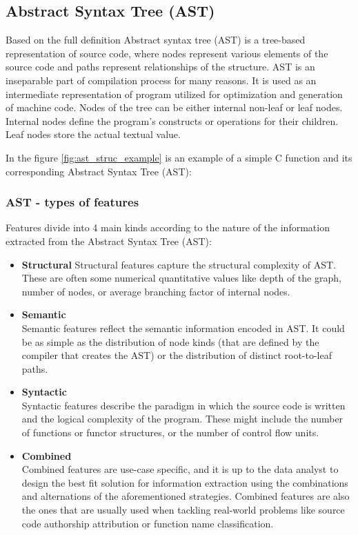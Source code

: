 \documentclass[conference]{IEEEtran}
\begin{document}
\subsection{Abstract Syntax Tree (AST)}

\quad Based on the full definition \citet{sun_ast} Abstract syntax tree (AST) is a tree-based representation of source code, where nodes represent various elements of the source code 
and paths represent relationships of the structure. AST is an inseparable part of compilation process for many reasons. It is used as an 
intermediate representation of program utilized for optimization and generation of machine code. Nodes of the tree can be either internal 
non-leaf or leaf nodes. Internal nodes define the program's constructs or operations for their children. Leaf nodes store the actual textual value. 

In the figure \ref{fig:ast_struc_example} is an example of a simple C function and its corresponding Abstract Syntax Tree (AST):

\subsubsection{AST - types of features}

Features divide into 4 main kinds according to the nature of the information extracted from the Abstract Syntax Tree (AST):
\begin{itemize}
    \item \textbf{Structural} \label{item:structural}
    Structural features capture the structural complexity of AST. These are often some numerical quantitative values like depth of the graph, number of nodes, or average branching factor of internal nodes.
    \item \textbf{Semantic} \\
    Semantic features reflect the semantic information encoded in AST. It could be as simple as the distribution of node kinds (that are defined by the compiler that creates the AST) or the distribution of distinct root-to-leaf paths.
    \item \textbf{Syntactic} \\
    Syntactic features describe the paradigm in which the source code is written and the logical complexity of the program. These might include the number of functions or functor structures, or the number of control flow units.
    \item \textbf{Combined} \\
    Combined features are use-case specific, and it is up to the data analyst to design the best fit solution for information extraction using the combinations and alternations of the aforementioned strategies. Combined features are also the ones that are usually used when tackling real-world problems like source code authorship attribution or function name classification.  
\end{itemize}
\end{document}
